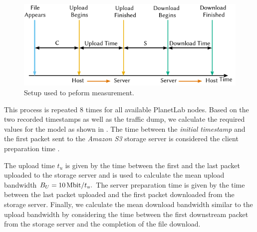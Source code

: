 \begin{figure}
  \includegraphics{application/cloud_file_synchronization/application_measurements/figures/measurement_setup}
  \caption{Setup used to peform measurement.}
  \label{fig:application:cloud_file_synchronisation:application_measurements:bandwidth_preparation_times:measurement_setup}
\end{figure}

This process is repeated \(8\) times for all available PlanetLab nodes.
Based on the two recorded timestamps as well as the traffic dump, we calculate the required values for the model as shown in .
The time between the \emph{initial timestamp} and the first packet sent to the \emph{Amazon S3} storage server is considered the client preparation time \clientpreparationtime.


The upload time \(t_u\) is given by the time between the first and the last packet uploaded to the storage server and is used to calculate the mean upload bandwidth \(\uploadbandwidth = \SI{10}{\mega\bit} / t_u.\)
The server preparation time \serverpreparationtime is given by the time between the last packet uploaded and the first packet downloaded from the storage server.
Finally, we calculate the mean download bandwidth \downloadbandwidth similar to the upload bandwidth by considering the time between the first downstream packet from the storage server and the completion of the file download.

